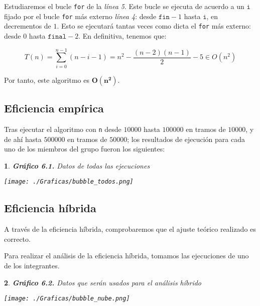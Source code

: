 \documentclass[10pt, a4paper]{article}
\theoremstyle{theorem-style}
\newtheorem*{datos}{}
\theoremstyle{theorem-style}
\theoremstyle{definition-style}
\theoremstyle{remark-style}
\theoremstyle{example-style}
\theoremstyle{definition-style}
\theoremstyle{remark-style}
\begin{document}
Estudiaremos el bucle \texttt{for} de la \emph{línea 5}. Este bucle se ejecuta de acuerdo a un $\texttt{i}$ fijado por el bucle \texttt{for} más externo \emph{línea 4}: desde $\texttt{fin}-1$ hasta $\texttt{i}$, en decrementos de $1$. Esto se ejecutará tantas veces como dicta el \texttt{for} más externo: desde $0$ hasta $\texttt{final}-2$. En definitiva, tenemos que:

$$ T(n) = \sum_{i=0}^{n-1}\left(n-i-1\right) = n^2 - \frac{(n-2)(n-1)}{2} - 5 \in O(n^2) $$

Por tanto, este algoritmo es $\boldsymbol{O(n^2)}$.

\subsection{Eficiencia empírica}

Tras ejecutar el algoritmo con \texttt{n} desde $10000$ hasta $100000$ en tramos de $10000$, y de ahí hasta $500000$ en tramos de $50000$; los resultados de ejecución para cada uno de los miembros del grupo fueron los siguientes:
\pagebreak
\begin{datos}\hspace{-0.2cm}
	{\bf\sffamily Gráfico 6.1.} {\sffamily Datos de todas las ejecuciones}\\
	\vspace{-0.7cm}
	\begin{center}
		\texttt{[image: ./Graficas/bubble\_todos.png]}
	\end{center}
\end{datos}

\subsection{Eficiencia híbrida}

A través de la eficiencia híbrida, comprobaremos que el ajuste teórico realizado es correcto.

Para realizar el análisis de la eficiencia híbrida, tomamos las ejecuciones de uno de los integrantes.

\pagebreak

\begin{datos}
	{\bf\sffamily Gráfico 6.2.} {\sffamily Datos que serán usados para el análisis híbrido}\\
	\vspace{-0.7cm}
	\begin{center}
		\texttt{[image: ./Graficas/bubble\_nube.png]}
	\end{center}	
\end{datos}
\end{document}
